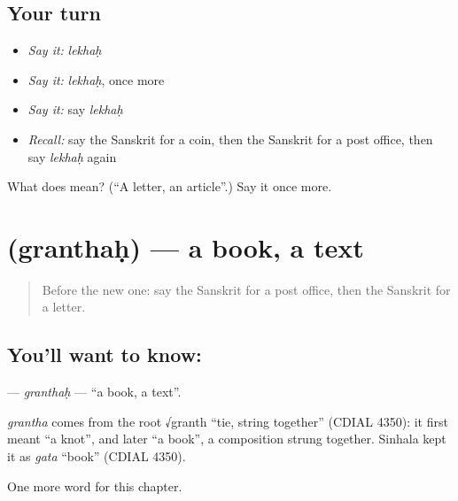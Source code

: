 \subsection*{Your turn}
\begin{itemize}
\raggedright
  \item \emph{Say it:} \emph{lekhaḥ}
  \item \emph{Say it:} \emph{lekhaḥ}, once more
  \item \emph{Say it:} say \emph{lekhaḥ}
  \item \emph{Recall:} say the Sanskrit for a coin, then the Sanskrit for a post office, then say \emph{lekhaḥ} again
\end{itemize}

\begin{tcolorbox}[breakable,colback=teal!4,colframe=teal!35!black,title={Before you move on}]
What does  mean? (\textquotedblleft{}A letter, an article\textquotedblright{}.) Say it once more.
\end{tcolorbox}
\section[\texorpdfstring{\sk{ग्रन्थः} (granthaḥ)}{ग्रन्थः (granthaḥ)}]{ (granthaḥ) — a book, a text}

\label{lesson:SA-C120-granthah}



\begin{quote}
Before the new one: say the Sanskrit for a post office, then the Sanskrit for a letter.
\end{quote}

\subsection*{You'll want to know: }
\textbf{} — \emph{granthaḥ} — \textquotedblleft{}a book, a text\textquotedblright{}.

\begin{cousinweb}
\emph{grantha} comes from the root √granth \textquotedblleft{}tie, string together\textquotedblright{} (CDIAL 4350): it first meant \textquotedblleft{}a knot\textquotedblright{}, and later \textquotedblleft{}a book\textquotedblright{}, a composition strung together. Sinhala kept it as \emph{gata} \textquotedblleft{}book\textquotedblright{} (CDIAL 4350).
\end{cousinweb}

\begin{grammarlens}[title={What you've built}]
One more word for this chapter.
\end{grammarlens}

